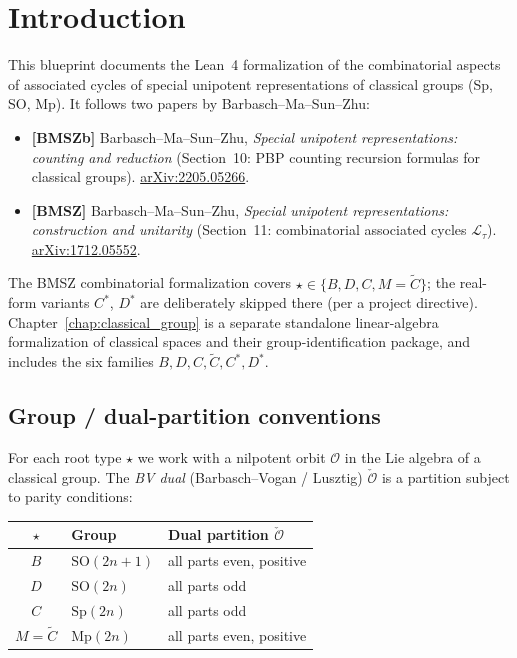 \chapter{Introduction}
\label{chap:intro}

This blueprint documents the Lean~4 formalization of the combinatorial
aspects of associated cycles of special unipotent representations of
classical groups (Sp, SO, Mp). It follows two papers by
Barbasch--Ma--Sun--Zhu:

\begin{itemize}
\item \textbf{[BMSZb]} Barbasch--Ma--Sun--Zhu, \emph{Special unipotent
      representations: counting and reduction} (Section~10: PBP counting
      recursion formulas for classical groups).
      \href{https://arxiv.org/abs/2205.05266}{arXiv:2205.05266}.
\item \textbf{[BMSZ]} Barbasch--Ma--Sun--Zhu, \emph{Special unipotent
      representations: construction and unitarity} (Section~11:
      combinatorial associated cycles $\mathcal{L}_\tau$).
      \href{https://arxiv.org/abs/1712.05552}{arXiv:1712.05552}.
\end{itemize}

The BMSZ combinatorial formalization covers
$\star \in \{B, D, C, M = \tilde{C}\}$; the real-form variants $C^*$, $D^*$ are
deliberately skipped there (per a project directive).  Chapter~\ref{chap:classical_group}
is a separate standalone linear-algebra formalization of classical spaces and
their group-identification package, and includes the six families
$B,D,C,\widetilde C,C^*,D^*$.

\section{Group / dual-partition conventions}

For each root type $\star$ we work with a nilpotent orbit $\mathcal{O}$ in
the Lie algebra of a classical group. The \emph{BV dual} (Barbasch--Vogan /
Lusztig) $\check{\mathcal{O}}$ is a partition subject to parity conditions:

\begin{center}
\begin{tabular}{c|l|l}
  $\star$ & Group & Dual partition $\check{\mathcal{O}}$ \\\hline
  $B$ & $\mathrm{SO}(2n+1)$ & all parts even, positive \\
  $D$ & $\mathrm{SO}(2n)$   & all parts odd \\
  $C$ & $\mathrm{Sp}(2n)$   & all parts odd \\
  $M = \tilde{C}$ & $\mathrm{Mp}(2n)$ & all parts even, positive \\
\end{tabular}
\end{center}

